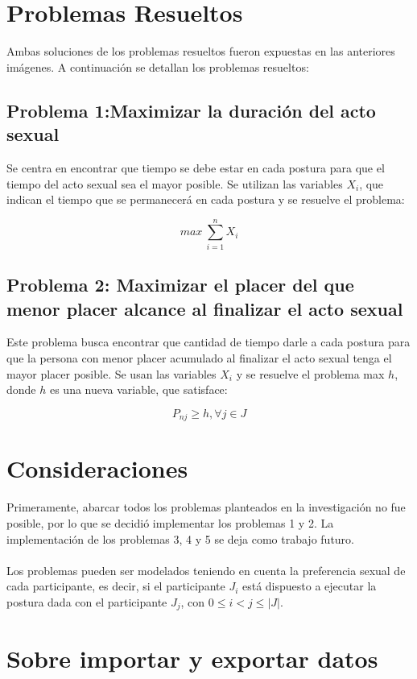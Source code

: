 \documentclass[12pt]{article}
\begin{document}
\newpage

\section{Problemas Resueltos}
Ambas soluciones de los problemas resueltos fueron expuestas en las anteriores imágenes. A continuación se detallan los problemas resueltos:

\subsection{Problema 1:Maximizar la duración del acto sexual}

Se centra en encontrar que tiempo se debe estar en cada postura para que el tiempo del acto sexual sea el mayor posible. Se utilizan las variables $X_i$, que indican el tiempo que se permanecerá en cada postura y se resuelve el problema:

$$max\ \sum^{n}_{i=1}X_i$$

\subsection{Problema 2: Maximizar el placer del que menor placer alcance al finalizar el acto sexual}

Este problema busca encontrar que cantidad de tiempo darle a cada postura para que la persona con menor placer acumulado al finalizar el acto sexual tenga el mayor placer posible. Se usan las variables $X_i$ y se resuelve el problema max $h$, donde $h$ es una nueva variable, que satisface:

$$P_{nj} \geq h, \forall j \in J$$



\section{Consideraciones}

Primeramente, abarcar todos los problemas planteados en la investigación no fue posible, por lo que se decidió implementar los problemas 1 y 2. La implementación de los problemas 3, 4 y 5 se deja como trabajo futuro.
\\ \\
Los problemas pueden ser modelados teniendo en cuenta la preferencia sexual de cada participante, es decir, si el participante $J_i$ está dispuesto a ejecutar la postura dada con el participante $J_j$, con $0 \leq i <j \leq |J|$. 

\section{Sobre importar y exportar datos}
\end{document}
